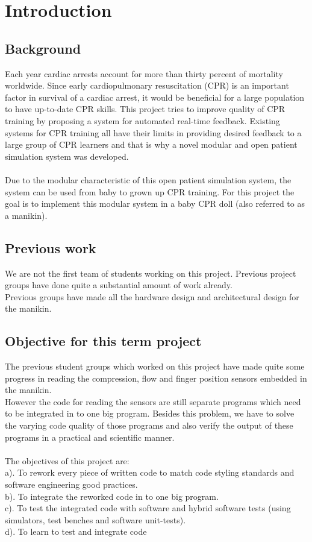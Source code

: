 \chapter{Introduction}
\label{chapter:intro}

\section{Background}
Each year cardiac arrests account for more than thirty percent of mortality worldwide. Since
early cardiopulmonary resuscitation (CPR) is an important factor in survival of a cardiac arrest,
it would be beneficial for a large population to have up-to-date CPR skills. This project tries to
improve quality of CPR training by proposing a system for automated real-time feedback.
Existing systems for CPR training all have their limits in providing desired feedback to a large
group of CPR learners and that is why a novel modular and open patient simulation system was
developed. \cite{jakortenmsc}\\\\
Due to the modular characteristic of this open patient simulation system, the system can be used from baby to grown up CPR training. 
For this project the goal is to implement this modular system in a baby CPR doll (also referred to as a manikin).\\
\section{Previous work}
We are not the first team of students working on this project. Previous project groups have done quite a substantial amount of work already. \\
Previous groups have made all the hardware design and architectural design for the manikin.\\ 
\section{Objective for this term project}
The previous student groups which worked on this project have made quite some progress in reading the compression, flow and finger position sensors embedded in the manikin.
\\However the code for reading the sensors are still separate programs which need to be integrated in to one big program. Besides this problem, we have to solve the varying code quality of those programs and also verify the output of these programs in a practical and scientific manner.\\\\
The objectives of this project are:\\
a). To rework every piece of written code to match code styling standards and software engineering good practices.\\
b). To integrate the reworked code in to one big program.\\
c). To test the integrated code with software and hybrid software tests (using simulators, test benches and software unit-tests).\\
d). To learn to test and integrate code 

